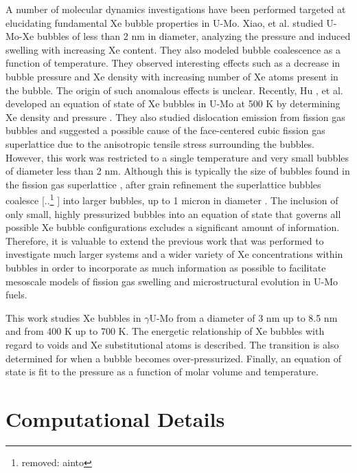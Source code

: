 \documentclass[review]{elsarticle}
\providecommand{\DIFaddtex}[1]{{\protect\color{blue} \sf #1}} %
\providecommand{\DIFdeltex}[1]{{\protect\color{red} [..\footnote{removed: #1} ]}} %
\providecommand{\DIFaddbegin}{} %
\providecommand{\DIFaddend}{} %
\providecommand{\DIFdelbegin}{} %
\providecommand{\DIFdelend}{} %
\providecommand{\DIFadd}[1]{\texorpdfstring{\DIFaddtex{#1}}{#1}} %
\providecommand{\DIFdel}[1]{\texorpdfstring{\DIFdeltex{#1}}{}} %
\newcommand{\DIFscaledelfig}{0.5}
\newlength{\DIFdelgraphicswidth} %
\newlength{\DIFdelgraphicsheight} %
\newcommand{\DIFaddincludegraphics}[2][]{{\color{blue}\fbox{\DIFOincludegraphics[#1]{#2}}}} %
\newcommand{\DIFdelincludegraphics}[2][]{%
\sbox{\DIFdelgraphicsbox}{\DIFOincludegraphics[#1]{#2}}%
\settoboxwidth{\DIFdelgraphicswidth}{\DIFdelgraphicsbox} %
\settoboxtotalheight{\DIFdelgraphicsheight}{\DIFdelgraphicsbox} %
\scalebox{\DIFscaledelfig}{%
\parbox[b]{\DIFdelgraphicswidth}{\usebox{\DIFdelgraphicsbox}\\[-\baselineskip] \rule{\DIFdelgraphicswidth}{0em}}\llap{\resizebox{\DIFdelgraphicswidth}{\DIFdelgraphicsheight}{%
\setlength{\unitlength}{\DIFdelgraphicswidth}%
\begin{picture}(1,1)%
\thicklines\linethickness{2pt} %
{\color[rgb]{1,0,0}\put(0,0){\framebox(1,1){}}}%
{\color[rgb]{1,0,0}\put(0,0){\line( 1,1){1}}}%
{\color[rgb]{1,0,0}\put(0,1){\line(1,-1){1}}}%
\end{picture}%
}\hspace*{3pt}}} %
} %
\DeclareRobustCommand{\DIFaddbegin}{\DIFOaddbegin \let\includegraphics\DIFaddincludegraphics} %
\DeclareRobustCommand{\DIFaddend}{\DIFOaddend \let\includegraphics\DIFOincludegraphics} %
\DeclareRobustCommand{\DIFdelbegin}{\DIFOdelbegin \let\includegraphics\DIFdelincludegraphics} %
\DeclareRobustCommand{\DIFdelend}{\DIFOaddend \let\includegraphics\DIFOincludegraphics} %
\begin{document}
A number of molecular dynamics investigations have been performed targeted at elucidating fundamental Xe bubble properties in U-Mo. Xiao, et al. \cite{xiao2014, xiao2015} studied U-Mo-Xe bubbles of less than 2 nm in diameter, analyzing the pressure and induced swelling with increasing Xe content. They also modeled bubble coalescence as a function of temperature. They observed interesting effects such as a decrease in bubble pressure and Xe density with increasing number of Xe atoms present in the bubble. The origin of such anomalous effects is unclear. Recently, Hu\DIFaddbegin \DIFadd{, et al. }\DIFaddend developed an equation of state of Xe bubbles in U-Mo at 500 K by determining Xe density and pressure \cite{hu2017}. They also studied dislocation emission from fission gas bubbles and suggested a possible cause of the face-centered cubic fission gas superlattice due to the anisotropic tensile stress surrounding the bubbles. However, this work was restricted to a single temperature and very small bubbles of diameter less than 2 nm. Although this is typically the size of bubbles found in the fission gas superlattice \cite{kim2011}, after grain refinement the superlattice bubbles coalesce \DIFdelbegin \DIFdel{ainto }\DIFdelend \DIFaddbegin \DIFadd{into }\DIFaddend larger bubbles, up to 1 micron in diameter \cite{afip6report}. The inclusion of only small, highly pressurized bubbles into an equation of state that governs all possible Xe bubble configurations excludes a significant amount of information. Therefore, it is valuable to extend the previous work that was performed to investigate much larger systems and a wider variety of Xe concentrations within bubbles in order to incorporate as much information as possible to facilitate mesoscale models of fission gas swelling and microstructural evolution in U-Mo fuels.

This work studies Xe bubbles in $\gamma$U-Mo from a diameter of 3 nm up to 8.5 nm and from 400 K up to 700 K. The energetic relationship of Xe bubbles with regard to voids and Xe substitutional atoms is described. The transition is also determined for when a bubble becomes over-pressurized. Finally, an equation of state is fit to the pressure as a function of molar volume and temperature.

\section{Computational Details}
\end{document}
